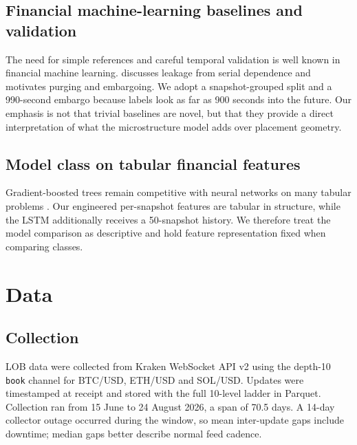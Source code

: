 \documentclass[11pt]{article}
\begin{document}
\subsection{Financial machine-learning baselines and validation}

The need for simple references and careful temporal validation is well known in
financial machine learning. \citet{lopezdeprado2018} discusses leakage from
serial dependence and motivates purging and embargoing. We adopt a
snapshot-grouped split and a 990-second embargo because labels look as far as
900 seconds into the future. Our emphasis is not that trivial baselines are
novel, but that they provide a direct interpretation of what the microstructure
model adds over placement geometry.

\subsection{Model class on tabular financial features}

Gradient-boosted trees remain competitive with neural networks on many tabular
problems \citep{grinsztajn2022,shwartz2022}. Our engineered per-snapshot
features are tabular in structure, while the LSTM additionally receives a
50-snapshot history. We therefore treat the model comparison as descriptive and
hold feature representation fixed when comparing classes.

\section{Data}
\label{sec:data}

\subsection{Collection}

LOB data were collected from Kraken WebSocket API v2 using the depth-10
\texttt{book} channel for BTC/USD, ETH/USD and SOL/USD. Updates were timestamped
at receipt and stored with the full 10-level ladder in Parquet. Collection ran
from 15 June to 24 August 2026, a span of 70.5 days. A 14-day collector outage
occurred during the window, so mean inter-update gaps include downtime; median
gaps better describe normal feed cadence.
\end{document}
